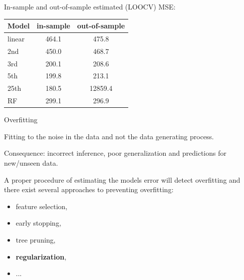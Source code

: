 \begin{frame}
\begin{analysis}
In-sample and out-of-sample estimated (LOOCV) MSE:

\begin{scriptsize}
\begin{center}
\begin{tabular}{lcc}
\hline
Model & in-sample & out-of-sample \\
\hline
linear &464.1  & 475.8\\
2nd &450.0   &468.7\\
3rd &200.1   &208.6\\
5th &199.8   &213.1\\
25th &180.5 &12859.4\\
RF   &299.1 &296.9 \\
\hline
\hline
\end{tabular}
\end{center}
\end{scriptsize}

\smallskip

\end{analysis}
\end{frame}


\begin{frame}{Overfitting}

Fitting to the noise in the data and not the data generating process.

\bigskip

Consequence: incorrect inference, poor generalization and predictions for new/unseen data.

\bigskip

A proper procedure of estimating the models error will detect overfitting and there exist several approaches to preventing overfitting:

\begin{itemize}
\item feature selection,
\item early stopping,
\item tree pruning,
\item \textbf{regularization},
\item ...
\end{itemize}

\end{frame}

